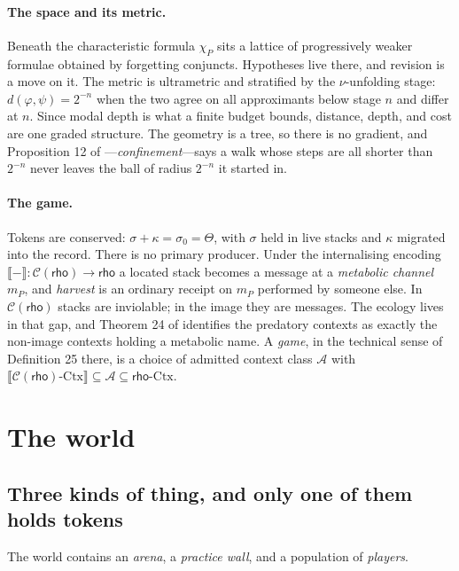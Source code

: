 \documentclass[11pt]{article}
\theoremstyle{definition}
\theoremstyle{plain}
\theoremstyle{remark}
\newcommand{\rh}{\textsf{rho}}
\newcommand{\Cost}{\mathcal{C}}
\begin{document}
\paragraph{The space and its metric.} Beneath the characteristic formula
$\chi_P$ sits a lattice of progressively weaker formulae obtained by forgetting
conjuncts. Hypotheses live there, and revision is a move on it. The metric is
ultrametric and stratified by the $\nu$-unfolding stage: $d(\varphi,\psi) =
2^{-n}$ when the two agree on all approximants below stage $n$ and differ at
$n$. Since modal depth is what a finite budget bounds, distance, depth, and cost
are one graded structure. The geometry is a tree, so there is no gradient, and
Proposition 12 of \cite{scientist}---\emph{confinement}---says a walk whose
steps are all shorter than $2^{-n}$ never leaves the ball of radius $2^{-n}$ it
started in.

\paragraph{The game.} Tokens are conserved: $\sigma + \kappa = \sigma_0 =
\Theta$, with $\sigma$ held in live stacks and $\kappa$ migrated into the
record. There is no primary producer. Under the internalising encoding
$\llbracket -\rrbracket : \Cost(\rh) \to \rh$ a located stack becomes a message
at a \emph{metabolic channel} $m_P$, and \emph{harvest} is an ordinary receipt
on $m_P$ performed by someone else. In $\Cost(\rh)$ stacks are inviolable; in
the image they are messages. The ecology lives in that gap, and Theorem 24 of
\cite{scientist} identifies the predatory contexts as exactly the non-image
contexts holding a metabolic name. A \emph{game}, in the technical sense of
Definition 25 there, is a choice of admitted context class $\mathcal{A}$ with
$\llbracket \Cost(\rh)\text{-Ctx}\rrbracket \subseteq \mathcal{A} \subseteq
\rh\text{-Ctx}$.

\section{The world}\label{sec:world}

\subsection{Three kinds of thing, and only one of them holds tokens}

The world contains an \emph{arena}, a \emph{practice wall}, and a population of
\emph{players}.
\end{document}

